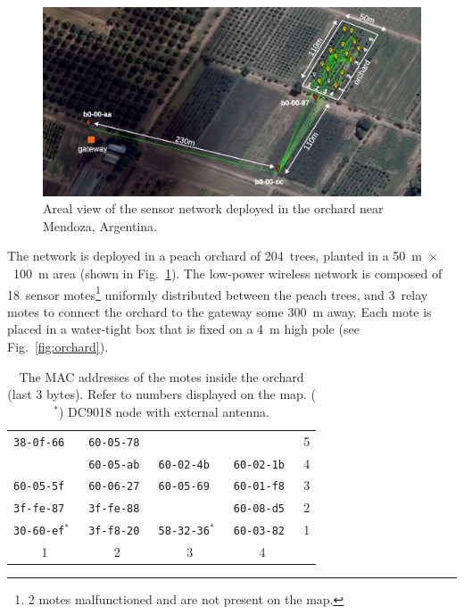 \documentclass{sig-alternate}
\begin{document}
\begin{figure}
    \centering
    \includegraphics[width=\textwidth]{map_annotated}
    \caption{Areal view of the sensor network deployed in the orchard near Mendoza, Argentina.}
    \label{fig:map}
\end{figure}


The network is deployed in a peach orchard of 204~trees, planted in a 50~m~$\times$~100~m area (shown in Fig.~\ref{fig:map}).
The low-power wireless network is composed of 18~sensor motes\footnote{2 motes malfunctioned and are not present on the map.} uniformly distributed between the peach trees, and 3~relay motes to connect the orchard to the gateway some 300~m away.
Each mote is placed in a water-tight box that is fixed on a 4~m high pole (see Fig.~\ref{fig:orchard}).
\newpage

\begin{table}
\begin{center}
    \begin{tabular}{ | l | l | l | l | l |}
         \hline
         \tt{38-0f-66}     & \tt{60-05-78} &                   &               & 5 \\
                           & \tt{60-05-ab} & \tt{60-02-4b}     & \tt{60-02-1b} & 4 \\
         \tt{60-05-5f}     & \tt{60-06-27} & \tt{60-05-69}     & \tt{60-01-f8} & 3 \\
         \tt{3f-fe-87}     & \tt{3f-fe-88} &                   & \tt{60-08-d5} & 2 \\
         \tt{30-60-ef}$^*$ & \tt{3f-f8-20} & \tt{58-32-36}$^*$ & \tt{60-03-82} & 1 \\
         \hline
           \multicolumn{1}{|c|}{1} & \multicolumn{1}{|c|}{2} & \multicolumn{1}{|c|}{3} & \multicolumn{1}{|c|}{4} &\\
         \hline
    \end{tabular}
    \caption{The MAC addresses of the motes inside the orchard (last 3 bytes). Refer to numbers displayed on the map. ($^*$) DC9018 node with external antenna.}
\end{center}
\end{table}
\end{document}
